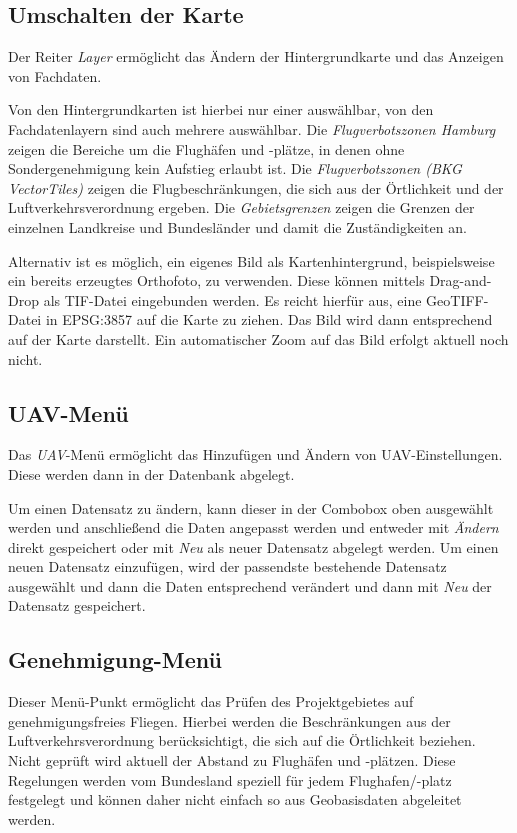 \documentclass[a4paper,12pt,bibliography=totoc, listof=totoc,titlepage]{scrartcl}
\begin{document}
\subsection{Umschalten der Karte}
Der Reiter \textit{Layer} ermöglicht das Ändern der Hintergrundkarte und das Anzeigen von Fachdaten.

Von den Hintergrundkarten ist hierbei nur einer auswählbar, von den Fachdatenlayern sind auch mehrere auswählbar. Die \textit{Flugverbotszonen Hamburg} zeigen die Bereiche um die Flughäfen und -plätze, in denen ohne Sondergenehmigung kein Aufstieg erlaubt ist. Die \textit{Flugverbotszonen (BKG VectorTiles)} zeigen die Flugbeschränkungen, die sich aus der Örtlichkeit und der Luftverkehrsverordnung ergeben. Die \textit{Gebietsgrenzen} zeigen die Grenzen der einzelnen Landkreise und Bundesländer und damit die Zuständigkeiten an.

Alternativ ist es möglich, ein eigenes Bild als Kartenhintergrund, beispielsweise ein bereits erzeugtes Orthofoto, zu verwenden. Diese können mittels Drag-and-Drop als TIF-Datei eingebunden werden. Es reicht hierfür aus, eine GeoTIFF-Datei in EPSG:3857 auf die Karte zu ziehen. Das Bild wird dann entsprechend auf der Karte darstellt. Ein automatischer Zoom auf das Bild erfolgt aktuell noch nicht.

\subsection{UAV-Menü}
\label{uav}
Das \textit{UAV}-Menü ermöglicht das Hinzufügen und Ändern von UAV-Einstellungen. Diese werden dann in der Datenbank abgelegt.

Um einen Datensatz zu ändern, kann dieser in der Combobox oben ausgewählt werden und anschließend die Daten angepasst werden und entweder mit \textit{Ändern} direkt gespeichert oder mit \textit{Neu} als neuer Datensatz abgelegt werden. Um einen neuen Datensatz einzufügen, wird der passendste bestehende Datensatz ausgewählt und dann die Daten entsprechend verändert und dann mit \textit{Neu} der Datensatz gespeichert.

\subsection{Genehmigung-Menü}
Dieser Menü-Punkt ermöglicht das Prüfen des Projektgebietes auf genehmigungsfreies Fliegen. Hierbei werden die Beschränkungen aus der Luftverkehrsverordnung berück\-sichtigt, die sich auf die Örtlichkeit beziehen. Nicht geprüft wird aktuell der Abstand zu Flughäfen und -plätzen. Diese Regelungen werden vom Bundesland speziell für jedem Flughafen/-platz festgelegt und können daher nicht einfach so aus Geobasisdaten abgeleitet werden.
\end{document}
